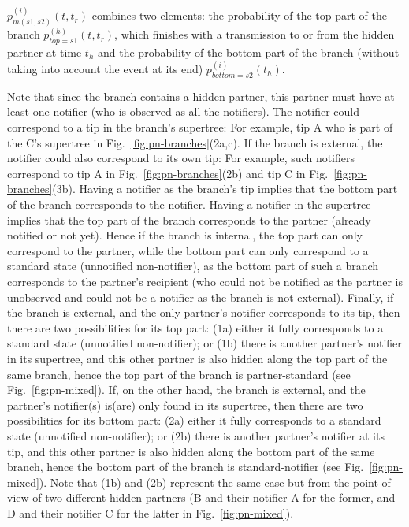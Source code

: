 \documentclass[10pt,letterpaper]{article}
\begin{document}
$p_{m(s1,s2)}^{(i)}(t,t_r)$ combines two elements: the probability of the top part of the branch $p_{top=s1}^{(h)}(t, t_r)$, which finishes with a transmission to or from the hidden partner at time $t_h$ and the probability of the bottom part of the branch (without taking into account the event at its end) $p_{bottom=s2}^{(i)}(t_h)$.

Note that since the branch contains a hidden partner, this partner must have at least one notifier (who is observed as all the notifiers).  The notifier could correspond to a tip in the branch's supertree: For example, tip A who is part of the C's supertree in Fig.~\ref{fig:pn-branches}(2a,c). If the branch is external, the notifier could also correspond to its own tip: For example, such notifiers correspond to tip A in Fig.~\ref{fig:pn-branches}(2b) and tip C in Fig.~\ref{fig:pn-branches}(3b).
Having a notifier as the branch's tip implies that the bottom part of the branch corresponds to the notifier. Having a notifier in the supertree implies that the top part of the branch corresponds to the partner (already notified or not yet). Hence if the branch is internal, the top part can only correspond to the partner, while the bottom part can only correspond to a standard state (unnotified non-notifier), as the bottom part of such a branch corresponds to the partner's recipient (who could not be notified as the partner is unobserved and could not be a notifier as the branch is not external). Finally, if the branch is external, and the only partner's notifier corresponds to its tip, then there are two possibilities for its top part: (1a) either it fully corresponds to a standard state (unnotified non-notifier); or (1b) there is another partner's notifier in its supertree, and this other partner is also hidden along the top part of the same branch, hence the top part of the branch is partner-standard (see Fig.~\ref{fig:pn-mixed}). If, on the other hand, the branch is external, and the partner's notifier(s) is(are) only found in its supertree, then there are two possibilities for its bottom part: (2a) either it fully corresponds to a standard state (unnotified non-notifier); or (2b) there is another partner's notifier at its tip, and this other partner is also hidden along the bottom part of the same branch, hence the bottom part of the branch is standard-notifier (see Fig.~\ref{fig:pn-mixed}). Note that (1b) and (2b) represent the same case but from the point of view of two different hidden partners (B and their notifier A for the former, and D and their notifier C for the latter in Fig.~\ref{fig:pn-mixed}).  
\end{document}
